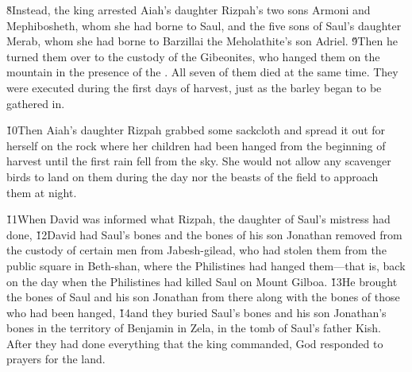 \v{8}Instead, the king arrested Aiah's daughter Rizpah's two sons Armoni and Mephibosheth, whom she had borne to Saul, and the five sons of Saul's daughter Merab, whom she had borne to Barzillai the Meholathite's son Adriel. \v{9}Then he turned them over to the custody of the Gibeonites, who hanged them on the mountain in the presence of the . All seven of them died at the same time. They were executed during the first days of harvest, just as the barley began to be gathered in.

\v{10}Then Aiah's daughter Rizpah grabbed some sackcloth and spread it out for herself on the rock where her children had been hanged from the beginning of harvest until the first rain fell from the sky. She would not allow any scavenger birds to land on them during the day nor the beasts of the field to approach them at night.

\v{11}When David was informed what Rizpah, the daughter of Saul's mistress had done, \v{12}David had Saul's bones and the bones of his son Jonathan removed from the custody of certain men from Jabesh-gilead, who had stolen them from the public square in Beth-shan, where the Philistines had hanged them---that is, back on the day when the Philistines had killed Saul on Mount Gilboa. \v{13}He brought the bones of Saul and his son Jonathan from there along with the bones of those who had been hanged, \v{14}and they buried Saul's bones and his son Jonathan's bones in the territory of Benjamin in Zela, in the tomb of Saul's father Kish. After they had done everything that the king commanded, God responded to prayers for the land.

